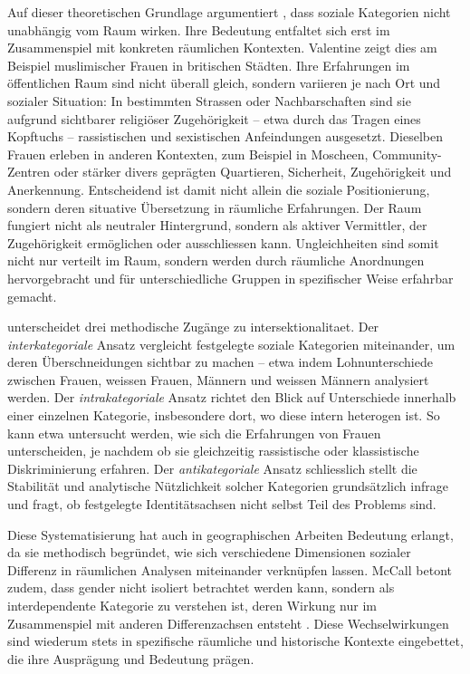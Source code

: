 Auf dieser theoretischen Grundlage argumentiert \textcite{valentineTheorizingResearchingIntersectionality2007}, dass soziale Kategorien nicht unabhängig vom Raum wirken. Ihre Bedeutung entfaltet sich erst im Zusammenspiel mit konkreten räumlichen Kontexten. Valentine zeigt dies am Beispiel muslimischer Frauen in britischen Städten. Ihre Erfahrungen im öffentlichen Raum sind nicht überall gleich, sondern variieren je nach Ort und sozialer Situation: In bestimmten Strassen oder Nachbarschaften sind sie aufgrund sichtbarer religiöser Zugehörigkeit -- etwa durch das Tragen eines Kopftuchs -- rassistischen und sexistischen Anfeindungen ausgesetzt. Dieselben Frauen erleben in anderen Kontexten, zum Beispiel in Moscheen, Community-Zentren oder stärker divers geprägten Quartieren, Sicherheit, Zugehörigkeit und Anerkennung. Entscheidend ist damit nicht allein die soziale Positionierung, sondern deren situative Übersetzung in räumliche Erfahrungen. Der Raum fungiert nicht als neutraler Hintergrund, sondern als aktiver Vermittler, der Zugehörigkeit ermöglichen oder ausschliessen kann. Ungleichheiten sind somit nicht nur verteilt im Raum, sondern werden durch räumliche Anordnungen hervorgebracht und für unterschiedliche Gruppen in spezifischer Weise erfahrbar gemacht.

\textcite{mccallComplexityIntersectionality2005} unterscheidet drei methodische Zugänge zu \gls{intersektionalitaet}. Der \emph{interkategoriale} Ansatz vergleicht festgelegte soziale Kategorien miteinander, um deren Überschneidungen sichtbar zu machen -- etwa indem Lohnunterschiede zwischen \emph{} Frauen, weissen Frauen, \emph{} Männern und weissen Männern analysiert werden. Der \emph{intrakategoriale} Ansatz richtet den Blick auf Unterschiede innerhalb einer einzelnen Kategorie, insbesondere dort, wo diese intern heterogen ist. So kann etwa untersucht werden, wie sich die Erfahrungen von Frauen unterscheiden, je nachdem ob sie gleichzeitig rassistische oder klassistische Diskriminierung erfahren. Der \emph{antikategoriale} Ansatz schliesslich stellt die Stabilität und analytische Nützlichkeit solcher Kategorien grundsätzlich infrage und fragt, ob festgelegte Identitätsachsen nicht selbst Teil des Problems sind.

Diese Systematisierung hat auch in geographischen Arbeiten Bedeutung erlangt, da sie methodisch begründet, wie sich verschiedene Dimensionen sozialer Differenz in räumlichen Analysen miteinander verknüpfen lassen. McCall betont zudem, dass \gls{gender} nicht isoliert betrachtet werden kann, sondern als interdependente Kategorie zu verstehen ist, deren Wirkung nur im Zusammenspiel mit anderen Differenzachsen entsteht \parencite{mccallSpatialRoutesGender1998}. Diese Wechselwirkungen sind wiederum stets in spezifische räumliche und historische Kontexte eingebettet, die ihre Ausprägung und Bedeutung prägen.

